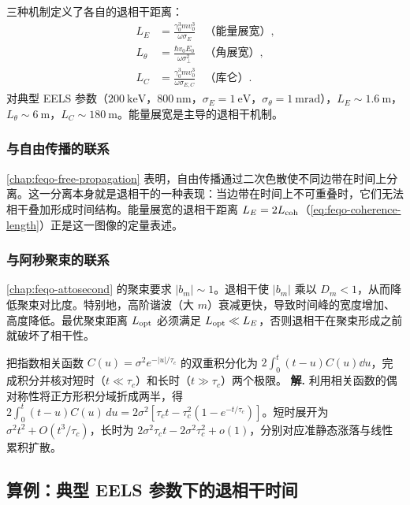 三种机制定义了各自的退相干距离：
\begin{align}
L_E&=\frac{\gamma_0^3mv_0^3}{\omega\sigma_E}&\text{（能量展宽）},\label{eq:feqo-LE-compare}\\
L_\theta&=\frac{\hbar v_0 E_0}{\omega\sigma_\perp^2}&\text{（角展宽）},\label{eq:feqo-Ltheta-compare}\\
L_C&=\frac{\gamma_0^3mv_0^3}{\omega\sigma_{E,C}}&\text{（库仑）}.\label{eq:feqo-LC-compare}
\end{align}
对典型 EELS 参数（$200\ \si{\kilo\electronvolt}$，$800\ \si{\nano\metre}$，$\sigma_E=1\ \si{\electronvolt}$，$\sigma_\theta=1\ \si{\milli\radian}$），$L_E\sim 1.6\ \si{\metre}$，$L_\theta\sim 6\ \si{\metre}$，$L_C\sim 180\ \si{\metre}$。能量展宽是主导的退相干机制。

\subsubsection{与自由传播的联系}

\cref{chap:feqo-free-propagation} 表明，自由传播通过二次色散使不同边带在时间上分离。这一分离本身就是退相干的一种表现：当边带在时间上不可重叠时，它们无法相干叠加形成时间结构。能量展宽的退相干距离 $L_E=2L_{\rm coh}$（\cref{eq:feqo-coherence-length}）正是这一图像的定量表述。

\subsubsection{与阿秒聚束的联系}

\cref{chap:feqo-attosecond} 的聚束要求 $|b_m|\sim 1$。退相干使 $|b_m|$ 乘以 $D_m<1$，从而降低聚束对比度。特别地，高阶谐波（大 $m$）衰减更快，导致时间峰的宽度增加、高度降低。最优聚束距离 $L_{\rm opt}$ 必须满足 $L_{\rm opt}\ll L_E$，否则退相干在聚束形成之前就破坏了相干性。


\par
\begin{workedexample}
把指数相关函数 $C(u)=\sigma^2 e^{-|u|/\tau_c}$ 的双重积分化为 $2\int_0^t(t-u)C(u)\dd u$，完成积分并核对短时（$t\ll\tau_c$）和长时（$t\gg\tau_c$）两个极限。
\textbf{解.} 利用相关函数的偶对称性将正方形积分域折成两半，得 $2\int_0^t(t-u)C(u)\,du=2\sigma^2[\tau_ct-\tau_c^2(1-e^{-t/\tau_c})]$。短时展开为 $\sigma^2t^2+O(t^3/\tau_c)$，长时为 $2\sigma^2\tau_ct-2\sigma^2\tau_c^2+o(1)$，分别对应准静态涨落与线性累积扩散。
\end{workedexample}
\par
\subsection{算例：典型 EELS 参数下的退相干时间}

